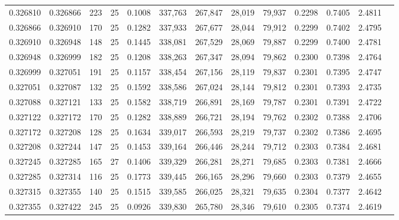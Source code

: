 \begin{tabular}{rrrrrrrrrrrrr}
0.326810 & 0.326866 &   223 &  25 &                                     0.1008 & 337,763 & 267,847 &  28,019 &  79,937 & 0.2298 & 0.7405 & 2.4811 \\
0.326866 & 0.326910 &   170 &  25 &                                     0.1282 & 337,933 & 267,677 &  28,044 &  79,912 & 0.2299 & 0.7402 & 2.4795 \\
0.326910 & 0.326948 &   148 &  25 &                                     0.1445 & 338,081 & 267,529 &  28,069 &  79,887 & 0.2299 & 0.7400 & 2.4781 \\
0.326948 & 0.326999 &   182 &  25 &                                     0.1208 & 338,263 & 267,347 &  28,094 &  79,862 & 0.2300 & 0.7398 & 2.4764 \\
0.326999 & 0.327051 &   191 &  25 &                                     0.1157 & 338,454 & 267,156 &  28,119 &  79,837 & 0.2301 & 0.7395 & 2.4747 \\
0.327051 & 0.327087 &   132 &  25 &                                     0.1592 & 338,586 & 267,024 &  28,144 &  79,812 & 0.2301 & 0.7393 & 2.4735 \\
0.327088 & 0.327121 &   133 &  25 &                                     0.1582 & 338,719 & 266,891 &  28,169 &  79,787 & 0.2301 & 0.7391 & 2.4722 \\
0.327122 & 0.327172 &   170 &  25 &                                     0.1282 & 338,889 & 266,721 &  28,194 &  79,762 & 0.2302 & 0.7388 & 2.4706 \\
0.327172 & 0.327208 &   128 &  25 &                                     0.1634 & 339,017 & 266,593 &  28,219 &  79,737 & 0.2302 & 0.7386 & 2.4695 \\
0.327208 & 0.327244 &   147 &  25 &                                     0.1453 & 339,164 & 266,446 &  28,244 &  79,712 & 0.2303 & 0.7384 & 2.4681 \\
0.327245 & 0.327285 &   165 &  27 &                                     0.1406 & 339,329 & 266,281 &  28,271 &  79,685 & 0.2303 & 0.7381 & 2.4666 \\
0.327285 & 0.327314 &   116 &  25 &                                     0.1773 & 339,445 & 266,165 &  28,296 &  79,660 & 0.2303 & 0.7379 & 2.4655 \\
0.327315 & 0.327355 &   140 &  25 &                                     0.1515 & 339,585 & 266,025 &  28,321 &  79,635 & 0.2304 & 0.7377 & 2.4642 \\
0.327355 & 0.327422 &   245 &  25 &                                     0.0926 & 339,830 & 265,780 &  28,346 &  79,610 & 0.2305 & 0.7374 & 2.4619 \\

\end{tabular}
